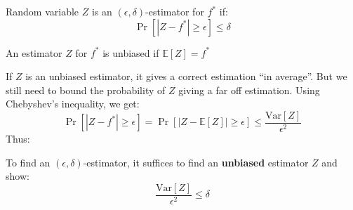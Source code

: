 \documentclass[11pt]{article}
\newcommand{\Ex}{\mathbb{E}}
\newcommand{\Var}{\text{Var}}
\begin{document}
\begin{definition}
Random variable $Z$ is an $(\epsilon,\delta)$-estimator for $f^*$ if:
\begin{equation*}
    \Pr[|Z - f^*| \geq \epsilon] \leq \delta
\end{equation*}
\end{definition}
\begin{definition}
An estimator $Z$ for $f^*$ is unbiased if $\Ex[Z] = f^*$
\end{definition}
If $Z$ is an unbiased estimator, it gives a correct estimation ``in average''. But we still need to bound the probability of $Z$ giving a far off estimation. Using Chebyshev's inequality, we get:
\begin{equation*}
    \Pr[|Z - f^*| \geq \epsilon] = \Pr[|Z - \Ex[Z]| \geq \epsilon] \leq \frac{\Var[Z]}{\epsilon^2}
\end{equation*}
Thus:
\begin{fact}\label{fact:varbound}
To find an $(\epsilon,\delta)$-estimator, it suffices to find an \textbf{unbiased} estimator $Z$ and show:
\begin{equation*}
    \frac{\Var[Z]}{\epsilon^2} \leq \delta
\end{equation*}
\end{fact}
\end{document}
